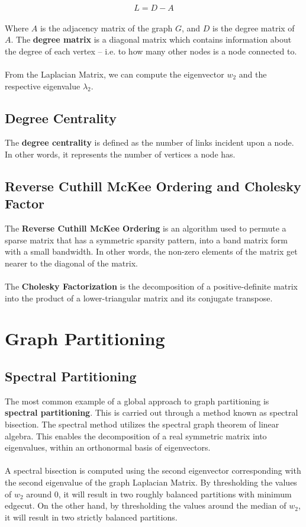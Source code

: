 \documentclass{article}
\begin{document}
\[ L = D - A \] \\
Where $A$ is the adjacency matrix of the graph $G$, and $D$ is the degree matrix of $A$. The \textbf{degree matrix} is a diagonal matrix which contains information about the degree of each vertex -- i.e. to how many other nodes is a node connected to. \\ \\
From the Laplacian Matrix, we can compute the eigenvector $w_2$ and the respective eigenvalue $\lambda_2$.

\subsection{Degree Centrality}
The \textbf{degree centrality} is defined as the number of links incident upon a node. In other words, it represents the number of vertices a node has.

\subsection{Reverse Cuthill McKee Ordering and Cholesky Factor}
The \textbf{Reverse Cuthill McKee Ordering} is an algorithm used to permute a sparse matrix that has a symmetric sparsity pattern, into a band matrix form with a small bandwidth. In other words, the non-zero elements of the matrix get nearer to the diagonal of the matrix. \\ \\
The \textbf{Cholesky Factorization} is the decomposition of a positive-definite matrix into the product of a lower-triangular matrix and its conjugate transpose.

\section{Graph Partitioning}
\subsection{Spectral Partitioning}
The most common example of a global approach to graph partitioning is \textbf{spectral partitioning}. This is carried out through a method known as spectral bisection. The spectral method utilizes the spectral graph theorem of linear algebra. This enables the decomposition of a real symmetric matrix into eigenvalues, within an orthonormal basis of eigenvectors. \\ \\
A spectral bisection is computed using the second eigenvector corresponding with the second eigenvalue of the graph Laplacian Matrix. By thresholding the values of $w_2$ around 0, it will result in two roughly balanced partitions with minimum edgecut. On the other hand, by thresholding the values around the median of $w_2$, it will result in two strictly balanced partitions.
\end{document}
